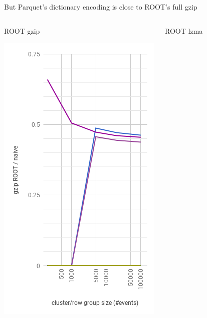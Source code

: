 \documentclass[aspectratio=169]{beamer}
\begin{document}
\begin{frame}{But Parquet's dictionary encoding is close to ROOT's full gzip}
\begin{columns}
\begin{center}
\mbox{\hspace{3 cm}}
ROOT gzip

\includegraphics[width=\linewidth]{root-gzip-2.png}
\end{center}
\begin{center}
\mbox{\hspace{3 cm}}
ROOT lzma


\end{center}
\end{columns}
\end{frame}
\end{document}
